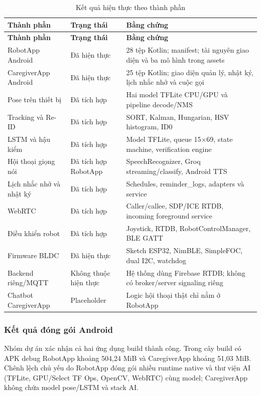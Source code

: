 \begin{longtable}{|p{4.0cm}|p{2.3cm}|p{6.7cm}|}
\caption{Kết quả hiện thực theo thành phần}\label{tab:implementation_results}\\
\hline
\textbf{Thành phần} & \textbf{Trạng thái} & \textbf{Bằng chứng} \\
\hline
\endfirsthead
\hline
\textbf{Thành phần} & \textbf{Trạng thái} & \textbf{Bằng chứng} \\
\hline
RobotApp Android & Đã hiện thực & 28 tệp Kotlin; manifest; tài nguyên giao diện và ba mô hình trong assets \\
\hline
CaregiverApp Android & Đã hiện thực & 25 tệp Kotlin; giao diện quản lý, nhật ký, lịch nhắc nhở và cuộc gọi \\
\hline
Pose trên thiết bị & Đã tích hợp & Hai model TFLite CPU/GPU và pipeline decode/NMS \\
\hline
Tracking và Re-ID & Đã tích hợp & SORT, Kalman, Hungarian, HSV histogram, ID0 \\
\hline
LSTM và hậu kiểm & Đã tích hợp & Model TFLite, queue 15$\times$69, state machine, verification engine \\
\hline
Hội thoại giọng nói & Đã tích hợp RobotApp & SpeechRecognizer, Groq streaming/classify, Android TTS \\
\hline
Lịch nhắc nhở và nhật ký & Đã tích hợp & Schedules, reminder\_logs, adapters và service \\
\hline
WebRTC & Đã tích hợp & Caller/callee, SDP/ICE RTDB, incoming foreground service \\
\hline
Điều khiển robot & Đã tích hợp & Joystick, RTDB, RobotControlManager, BLE GATT \\
\hline
Firmware BLDC & Đã hiện thực & Sketch ESP32, NimBLE, SimpleFOC, dual I2C, watchdog \\
\hline
Backend riêng/MQTT & Không thuộc hiện thực & Hệ thống dùng Firebase RTDB; không có broker/server signaling riêng \\
\hline
Chatbot CaregiverApp & Placeholder & Logic hội thoại thật chỉ nằm ở RobotApp \\
\hline
\end{longtable}

\subsubsection{Kết quả đóng gói Android}

Nhóm dự án xác nhận cả hai ứng dụng build thành công. Trong cây build có APK debug RobotApp khoảng 504,24 MiB và CaregiverApp khoảng 51,03 MiB. Chênh lệch chủ yếu do RobotApp đóng gói nhiều runtime native và thư viện AI (TFLite, GPU/Select TF Ops, OpenCV, WebRTC) cùng model; CaregiverApp không chứa model pose/LSTM và stack AI.

